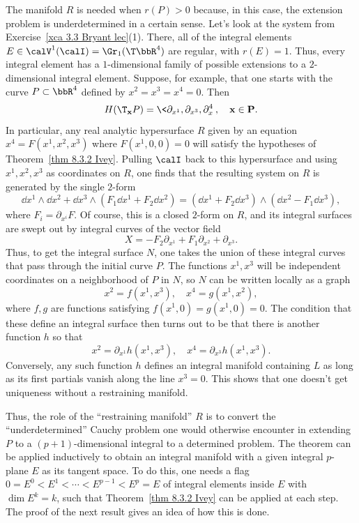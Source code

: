 \begin{example}
    The manifold $R$ is needed when $r(P)>0$ because, in this case, the extension problem is underdetermined in a certain sense. Let's look at the system from Exercise~\ref{xca 3.3 Bryant lec}(1). There, all of the integral elements $E\in\calV^1(\calI)=\Gr_1(\T \bbR^4)$ are regular, with $r(E)=1$. Thus, every integral element has a $1$-dimensional family of possible extensions to a $2$-dimensional integral element. Suppose, for example, that one starts with the curve $P\subset \bbR^4$ defined by $x^2=x^3=x^4=0$. Then 
    \[H(\T_{\bf{x}}P)=\<\partial_{x^1},\partial_{x^3},\partial_x^4\>,\quad \bf{x}\in P.\]
    In particular, any real analytic hypersurface $R$ given by an equation $x^4=F(x^1,x^2,x^3)$ where $F(x^1,0,0)=0$ will satisfy the hypotheses of Theorem~\ref{thm 8.3.2 Ivey}. Pulling $\calI$ back to this hypersurface and using $x^1,x^2,x^3$ as coordinates on $R$, one finds that the resulting system on $R$ is generated by the single $2$-form 
    \[\dd x^1\wedge\dd x^2+\dd x^3\wedge(F_1\dd x^1+F_2\dd x^2)=(\dd x^1+F_2\dd x^3)\wedge(\dd x^2-F_1\dd x^3),\]
    where $F_i=\partial_{x^i} F$. Of course, this is a closed $2$-form on $R$, and its integral surfaces are swept out by integral curves of the vector field 
    \[X=-F_2\partial_{x^1}+F_1\partial_{x^2}+\partial_{x^3}.\]
    Thus, to get the integral surface $N$, one takes the union of these integral curves that pass through the initial curve $P$. The functions $x^1,x^3$ will be independent coordinates on a neighborhood of $P$ in $N$, so $N$ can be written locally as a graph 
    \[x^2=f(x^1,x^3),\quad x^4=g(x^1,x^2),\]
    where $f,g$ are functions satisfying $f(x^1,0)=g(x^1,0)=0$. The condition that these define an integral surface then turns out to be that there is another function $h$ so that 
    \[x^2=\partial_{x^1}h(x^1,x^3),\quad x^4=\partial_{x^3}h(x^1,x^3).\]
    Conversely, any such function $h$ defines an integral manifold containing $L$ as long as its first partials vanish along the line $x^3=0$. This shows that one doesn't get uniqueness without a restraining manifold.
\end{example}

Thus, the role of the ``restraining manifold'' $R$ is to convert the ``underdetermined'' Cauchy problem one would otherwise encounter in extending $P$ to a $(p+1)$-dimensional integral to a determined problem. The theorem can be applied inductively to obtain an integral manifold with a given integral $p$-plane $E$ as its tangent space. To do this, one needs a flag $0=E^0<E^1<\cdots <E^{p-1}<E^p=E$ of integral elements inside $E$ with $\dim E^k=k$, such that Theorem~\ref{thm 8.3.2 Ivey} can be applied at each step. The proof of the next result gives an idea of how this is done.


